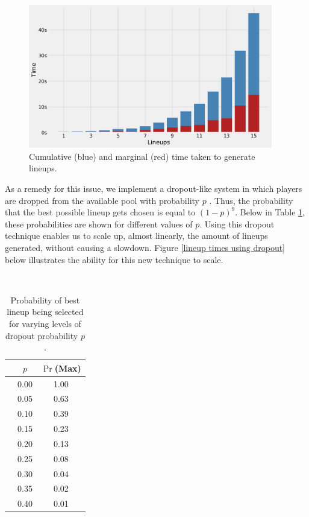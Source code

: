 \documentclass[12pt]{article}
\begin{document}
\begin{figure}[H]
  \centering
  \includegraphics[width=0.95\textwidth]{../figures/time_per_lineup}
  \caption{Cumulative (blue) and marginal (red) time taken to generate lineups.}
  \label{lineup times}
\end{figure}

As a remedy for this issue, we implement a dropout-like system in which players are dropped from the available pool with probability $p$ \cite{dropout}. Thus, the probability that the best possible lineup gets chosen is equal to $(1-p)^9$. Below in Table \ref{probs_of_lineups}, these probabilities are shown for different values of $p$. Using this dropout technique enables us to scale up, almost linearly, the amount of lineups generated, without causing a slowdown. Figure \ref{lineup times using dropout} below illustrates the ability for this new technique to scale.

﻿\begin{table}[H]
\caption{Probability of best lineup being selected for varying levels of dropout probability $p$.}
\label{probs_of_lineups}
\centering
\begin{tabular}{lcc}
\toprule
{} &     $p$ &  $\Pr$(Max)  \\
\midrule
{} &  0.00 &  1.00 \\
{} &  0.05 &  0.63 \\
{} &  0.10 &  0.39 \\
{} &  0.15 &  0.23 \\
{} &  0.20 &  0.13 \\
{} &  0.25 &  0.08 \\
{} &  0.30 &  0.04 \\
{} &  0.35 &  0.02 \\
{} &  0.40 &  0.01 \\
\bottomrule
\end{tabular}
\end{table}
\end{document}
